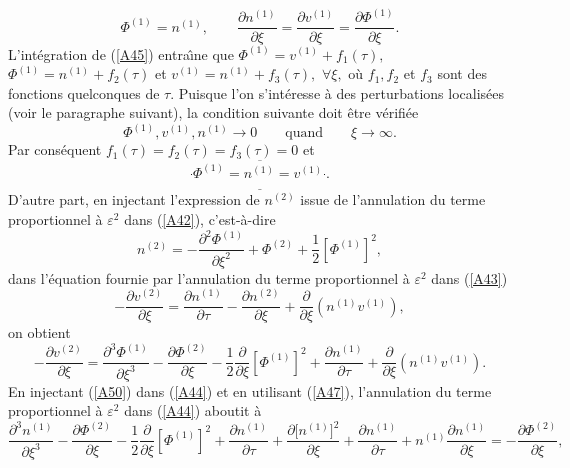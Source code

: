 \documentclass[10pt,thmsa]{article}
\begin{document}
\begin{equation}
\Phi^{(1)}=n^{(1)},\qquad\frac{\partial n^{(1)}}{\partial\xi}=\frac{\partial
v^{(1)}}{\partial\xi}=\frac{\partial\Phi^{(1)}}{\partial\xi}.\label{A45}%
\end{equation}
L'int\'{e}gration de (\ref{A45}) entra\^{\i}ne que $\Phi^{(1)}=v^{(1)}%
+f_{1}(\tau),$ $\Phi^{(1)}=n^{(1)}+f_{2}(\tau)$ et $v^{(1)}=n^{(1)}+f_{3}%
(\tau),$ $\forall\xi,$ o\`{u} $f_{1},f_{2}$ et $f_{3} $ sont des fonctions
quelconques de $\tau$. Puisque l'on s'int\'{e}resse \`{a} des perturbations
localis\'{e}es (voir le paragraphe suivant), la condition suivante doit
\^{e}tre v\'{e}rifi\'{e}e
\begin{equation}
\Phi^{(1)},v^{(1)},n^{(1)}\rightarrow0\qquad\text{quand}\qquad\xi
\rightarrow\infty.\label{A46}%
\end{equation}
Par cons\'{e}quent $f_{1}(\tau)=f_{2}(\tau)=f_{3}(\tau)=0$ et
\begin{equation}
\underline{\overline{\frac{^{{}}}{{}}\Phi^{(1)}=n^{(1)}=v^{(1)}\frac{^{{}}}%
{{}}.}}\label{A47}%
\end{equation}
D'autre part, en injectant l'expression de $n^{(2)}$ issue de l'annulation du
terme proportionnel \`{a} $\varepsilon^{2}$ dans (\ref{A42}),
c'est-\`{a}-dire
\begin{equation}
n^{(2)}=-\frac{\partial^{2}\Phi^{(1)}}{\partial\xi^{2}}+\Phi^{(2)}+\frac{1}%
{2}[\Phi^{(1)}]^{2},\label{A48}%
\end{equation}
dans l'\'{e}quation fournie par l'annulation du terme proportionnel \`{a}
$\varepsilon^{2}$ dans (\ref{A43})
\begin{equation}
-\frac{\partial v^{(2)}}{\partial\xi}=\frac{\partial n^{(1)}}{\partial\tau
}-\frac{\partial n^{(2)}}{\partial\xi}+\frac{\partial}{\partial\xi}\left(
n^{(1)}v^{(1)}\right)  ,\label{A49}%
\end{equation}
on obtient
\begin{equation}
-\frac{\partial v^{(2)}}{\partial\xi}=\frac{\partial^{3}\Phi^{(1)}}%
{\partial\xi^{3}}-\frac{\partial\Phi^{(2)}}{\partial\xi}-\frac{1}{2}%
\frac{\partial}{\partial\xi}[\Phi^{(1)}]^{2}+\frac{\partial n^{(1)}}%
{\partial\tau}+\frac{\partial}{\partial\xi}\left(  n^{(1)}v^{(1)}\right)
.\label{A50}%
\end{equation}
En injectant (\ref{A50}) dans (\ref{A44}) et en utilisant (\ref{A47}),
l'annulation du terme proportionnel \`{a} $\varepsilon^{2}$ dans (\ref{A44})
aboutit \`{a}
\[
\frac{\partial^{3}n^{(1)}}{\partial\xi^{3}}-\frac{\partial\Phi^{(2)}}%
{\partial\xi}-\frac{1}{2}\frac{\partial}{\partial\xi}[\Phi^{(1)}]^{2}%
+\frac{\partial n^{(1)}}{\partial\tau}+\frac{\partial\lbrack n^{(1)}]^{2}%
}{\partial\xi}+\frac{\partial n^{(1)}}{\partial\tau}+n^{(1)}\frac{\partial
n^{(1)}}{\partial\xi}=-\frac{\partial\Phi^{(2)}}{\partial\xi},
\]
\end{document}
